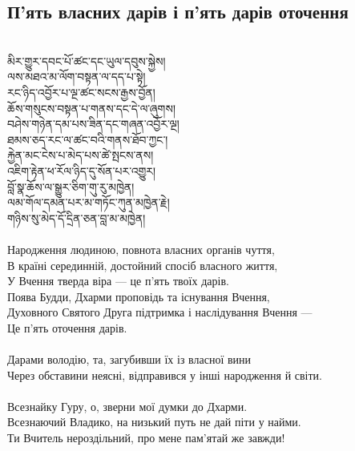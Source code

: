 \subsection*{П'ять власних дарів і п'ять дарів оточення}
\\
\ti
མིར་གྱུར་དབང་པོ་ཚང་དང་ཡུལ་དབུས་སྐྱེས།\\
ལས་མཐའ་མ་ལོག་བསྟན་ལ་དད་པ་སྟེ།\\
རང་ཉིད་འབྱོར་པ་ལྔ་ཚང་སངས་རྒྱས་བྱོན། \\
ཆོས་གསུངས་བསྟན་པ་གནས་དང་དེ་ལ་ཞུགས།\\
བཤེས་གཉེན་དམ་པས་ཟིན་དང་གཞན་འབྱོར་ལྔ།\\
ཐམས་ཅད་རང་ལ་ཚང་བའི་གནས་ཐོབ་ཀྱང༌།\\
རྐྱེན་མང་ངེས་པ་མེད་པས་ཚེ་སྤངས་ནས།\\
འཇིག་རྟེན་ཕ་རོལ་ཉིད་དུ་སོན་པར་འགྱུར།\\
བློ་སྣ་ཆོས་ལ་སྒྱུར་ཅིག་གུ་རུ་མཁྱེན།\\
ལམ་གོལ་དམན་པར་མ་གཏོང་ཀུན་མཁྱེན་རྗེ།\\
གཉིས་སུ་མེད་དོ་དྲིན་ཅན་བླ་མ་མཁྱེན།\\
\\
\ru
Народження людиною, повнота власних органів чуття,\\
В країні серединній, достойний спосіб власного життя,\\
У Вчення тверда віра --- це п'ять твоїх дарів.\\
Поява Будди, Дхарми проповідь та існування Вчення,\\
Духовного Святого Друга підтримка і наслідування Вчення ---\\
Це п'ять оточення дарів.\\
\\
Дарами володію, та, загубивши їх із власної вини \\
Через обставини неясні, відправився у інші народження й світи.\\
\\
Всезнайку Гуру, о, зверни мої думки до Дхарми.\\
Всезнаючий Владико, на низький путь не дай піти у найми.\\
Ти Вчитель нероздільний, про мене пам'ятай же завжди!\\

\newpage
